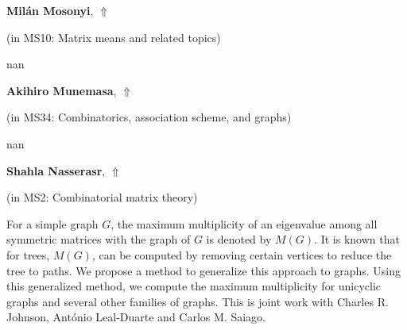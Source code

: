 \documentclass[ILAS2025-program.tex]{subfiles}
\begin{document}
\hypertarget{down0253}{}\begin{ilasabstract}
    
\textbf{Milán Mosonyi},  \hfill \hyperlink{up0253}{$\Uparrow$}
    
    
(in {\color{mstitle}MS10: Matrix means and related topics})
        
\mtskip
    nan
\end{ilasabstract}
    

\hypertarget{down0286}{}\begin{ilasabstract}
    
\textbf{Akihiro Munemasa},  \hfill \hyperlink{up0286}{$\Uparrow$}
    
    
(in {\color{mstitle}MS34: Combinatorics, association scheme, and graphs})
        
\mtskip
    nan
\end{ilasabstract}
    

\hypertarget{down0262}{}\begin{ilasabstract}
    
\textbf{Shahla Nasserasr},  \hfill \hyperlink{up0262}{$\Uparrow$}
    
    
(in {\color{mstitle}MS2: Combinatorial matrix theory})
        
\mtskip
    For a simple graph $G$, the maximum multiplicity of an eigenvalue among all symmetric matrices with the graph of $G$ is denoted by $M(G)$. It is known that for trees, $M(G)$, can be computed by removing certain vertices to reduce the tree to paths. We propose a method to generalize this approach to graphs. Using this generalized method, we compute the maximum multiplicity for unicyclic graphs and several other families of graphs.
This is joint work with Charles R. Johnson, Ant\'onio Leal-Duarte and Carlos M. Saiago.

\end{ilasabstract}
    
\end{document}
